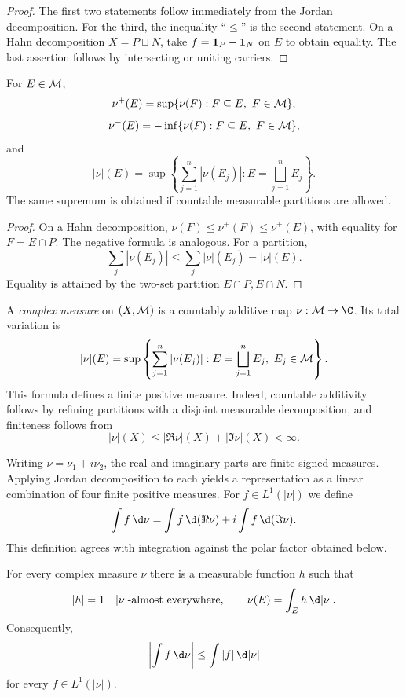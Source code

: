\begin{proof}
The first two statements follow immediately from the Jordan decomposition. For the third, the inequality ``$\leq$'' is the second statement. On a Hahn decomposition $X=P\sqcup N$, take $f=\mathbf{1}_P-\mathbf{1}_N$ on $E$ to obtain equality. The last assertion follows by intersecting or uniting carriers.
\end{proof}

\begin{prop}
For $E\in\mathcal{M}$,
\[
\nu^+(E)=\sup\{\nu(F):F\subseteq E,\ F\in\cM\},
\]
\[
\nu^-(E)=-\inf\{\nu(F):F\subseteq E,\ F\in\cM\},
\]
and
\[
|\nu|(E)=\sup\left\{\sum_{j=1}^n|\nu(E_j)|:
E=\bigsqcup_{j=1}^nE_j\right\}.
\]
The same supremum is obtained if countable measurable partitions are allowed.
\end{prop}

\begin{proof}
On a Hahn decomposition, $\nu(F)\leq\nu^+(F)\leq\nu^+(E)$, with equality for $F=E\cap P$. The negative formula is analogous. For a partition,
\[
\sum_j|\nu(E_j)|\leq\sum_j|\nu|(E_j)=|\nu|(E).
\]
Equality is attained by the two-set partition $E\cap P,E\cap N$.
\end{proof}

\begin{de}
A \emph{complex measure} on $(X,\mathcal{M})$ is a countably additive map $\nu:\cM\to\C$. Its total variation is
\[
|\nu|(E)=\sup\left\{\sum_{j=1}^n|\nu(E_j)|:
E=\bigsqcup_{j=1}^nE_j,\ E_j\in\mathcal{M}\right\}.
\]
This formula defines a finite positive measure. Indeed, countable additivity follows by refining partitions with a disjoint measurable decomposition, and finiteness follows from
\[
|\nu|(X)\leq |\Re\nu|(X)+|\Im\nu|(X)<\infty.
\]
\end{de}

\begin{remark}
Writing $\nu=\nu_1+i\nu_2$, the real and imaginary parts are finite signed measures. Applying Jordan decomposition to each yields a representation as a linear combination of four finite positive measures. For $f\in L^1(|\nu|)$ we define
\[
\int f\,\d\nu
 =\int f\,\d(\Re\nu)+i\int f\,\d(\Im\nu).
\]
This definition agrees with integration against the polar factor obtained below.
\end{remark}

\begin{thm}
For every complex measure $\nu$ there is a measurable function $h$ such that
\[
|h|=1\quad |\nu|\text{-almost everywhere},
\qquad
\nu(E)=\int_E h\,\d|\nu|.
\]
Consequently,
\[
\left|\int f\,\d\nu\right|\leq\int|f|\,\d|\nu|
\]
for every $f\in L^1(|\nu|)$.
\end{thm}

